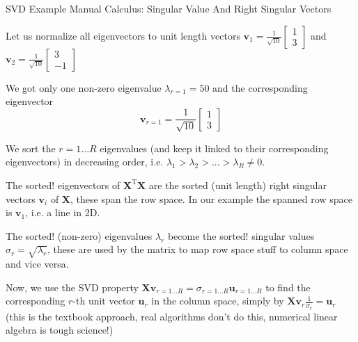 \documentclass[mathserif, aspectratio=1610]{intbeamer}
\begin{document}
\begin{frame}[t]{SVD Example Manual Calculus: Singular Value And Right Singular Vectors}

Let us normalize all eigenvectors to unit length vectors
$
\bm{v}_1 =
\frac{1}{\sqrt{10}}
\begin{bmatrix}
1 \\3
\end{bmatrix}$ and
$
\bm{v}_2 =
\frac{1}{\sqrt{10}}
\begin{bmatrix}
3 \\-1
\end{bmatrix}
$

We got only one non-zero eigenvalue $\lambda_{r=1} = 50$ and the corresponding
eigenvector
$$\bm{v}_{r=1} =
\frac{1}{\sqrt{10}}
\begin{bmatrix}
1 \\3
\end{bmatrix}$$

We sort the $r=1...R$ eigenvalues (and keep it linked to their
corresponding eigenvectors) in decreasing order, i.e. $\lambda_1 > \lambda_2 >... >\lambda_R \neq 0$.

The sorted! eigenvectors of $\bm{X}^\mathrm{T} \bm{X}$ are the sorted (unit length)
right singular vectors $\bm{v}_i$ of $\bm{X}$, these span the row space. In our example
the spanned row space is $\bm{v}_{1}$, i.e. a line in 2D.

The sorted! (non-zero) eigenvalues $\lambda_r$ become the sorted! singular values $\sigma_r = \sqrt{\lambda_r}$, these are used by the matrix to map row space stuff to column space and vice versa.

Now, we use the SVD property
$\bm{X} \bm{v}_{r=1...R} = \sigma_{r=1...R} \bm{u}_{r=1...R}$
to find the corresponding $r$-th unit vector $\bm{u}_r$ in the column space, simply by
$\bm{X} \bm{v}_{r} \frac{1}{\sigma_r} = \bm{u}_{r}$ (this is the textbook approach, real algorithms don't do this, numerical linear algebra is tough science!)

\end{frame}
\end{document}
